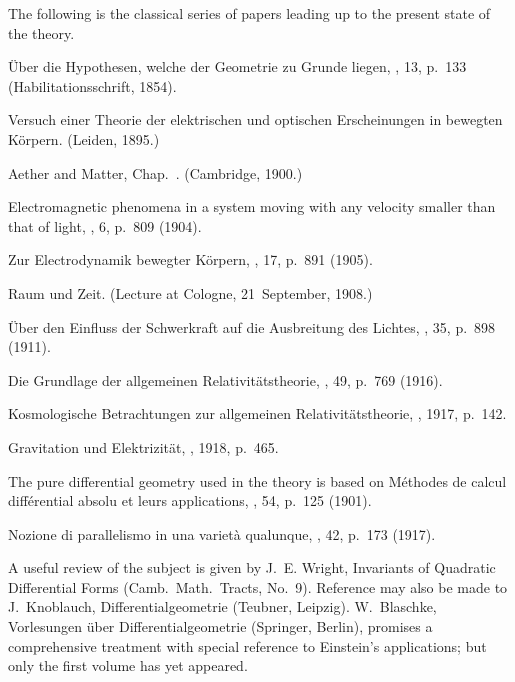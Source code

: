 \documentclass[12pt]{book}
\begin{document}

The following is the classical series of papers leading up to the present state of the theory.

 Über die Hypothesen, welche der Geometrie zu Grunde liegen, , 13, p.~133 (Habilitationsschrift, 1854).

 Versuch einer Theorie der elektrischen und optischen Erscheinungen in
bewegten Körpern. (Leiden, 1895.)

 Aether and Matter, Chap.~. (Cambridge, 1900.)

 Electromagnetic phenomena in a system moving with any velocity smaller
than that of light, , 6, p.~809 (1904).

 Zur Electrodynamik bewegter Körpern, , 17, p.~891 (1905).

 Raum und Zeit. (Lecture at Cologne, 21~September, 1908.)

 Über den Einfluss der Schwerkraft auf die Ausbreitung des Lichtes, , 35, p.~898 (1911).

 Die Grundlage der allgemeinen Relativitätstheorie, , 49, p.~769
(1916).

 Kosmologische Betrachtungen zur allgemeinen Relativitätstheorie, , 1917, p.~142.

 Gravitation und Elektrizität, , 1918, p.~465.
\medskip

The pure differential geometry used in the theory is based on
 Méthodes de calcul différential absolu et leurs
applications, \Title{Math.\ Ann.}, 54, p.~125 (1901).

 Nozione di parallelismo in una varietà qualunque, , 42, p.~173 (1917).
\medskip

A useful review of the subject is given by J.~E. Wright, Invariants of Quadratic Differential
Forms (Camb.\ Math.\ Tracts, No.~9). Reference may also be made to J.~Knoblauch,
Differentialgeometrie (Teubner, Leipzig). W.~Blaschke, Vorlesungen über Differentialgeometrie
(Springer, Berlin), promises a comprehensive treatment with special reference
to Einstein's applications; but only the first volume has yet appeared.
\medskip
\end{document}
